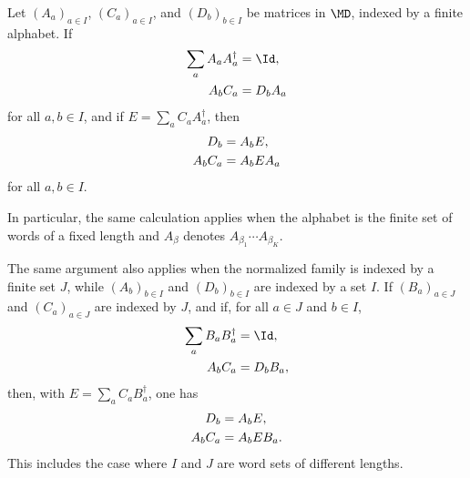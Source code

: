 \begin{lemma}
    \label{lem:normalized_boundary_matrix_identities}
    \leanok
    Let $(A_a)_{a\in I}$, $(C_a)_{a\in I}$, and $(D_b)_{b\in I}$ be matrices
    in $\MD$, indexed by a finite alphabet. If
    \begin{align}
        \sum_a A_a A_a^\dagger & = \Id,
        \notag                             \\
        A_b C_a                & = D_b A_a
        \notag
    \end{align}
    for all $a,b\in I$, and if $E=\sum_a C_a A_a^\dagger$, then
    \begin{align}
        D_b    & = A_bE,
        \notag             \\
        A_bC_a & = A_bEA_a
        \notag
    \end{align}
    for all $a,b\in I$.

    In particular, the same calculation applies when the alphabet is the finite
    set of words of a fixed length and $A_\beta$ denotes
    $A_{\beta_1}\cdots A_{\beta_K}$.

    The same argument also applies when the normalized family is indexed by a
    finite set $J$, while $(A_b)_{b\in I}$ and $(D_b)_{b\in I}$ are indexed
    by a set $I$. If $(B_a)_{a\in J}$ and $(C_a)_{a\in J}$ are indexed by
    $J$, and if, for all $a\in J$ and $b\in I$,
    \begin{align}
        \sum_a B_aB_a^\dagger & = \Id,
        \notag                            \\
        A_bC_a                & = D_bB_a,
        \notag
    \end{align}
    then, with $E=\sum_a C_aB_a^\dagger$, one has
    \begin{align}
        D_b    & = A_bE,
        \notag              \\
        A_bC_a & = A_bEB_a.
        \notag
    \end{align}
    This includes the case where $I$ and $J$ are word sets of different
    lengths.
\end{lemma}

